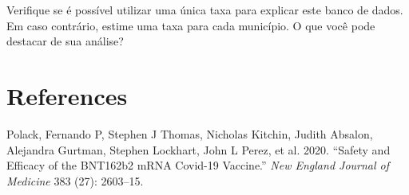 \documentclass[
  letterpaper,
  DIV=11,
  numbers=noendperiod]{scrreprt}
\newlength{\cslhangindent}
\newenvironment{CSLReferences}[2] %
 {\begin{list}{}{%
  \setlength{\itemindent}{0pt}
  \setlength{\leftmargin}{0pt}
  \setlength{\parsep}{0pt}
  \ifodd #1
   \setlength{\leftmargin}{\cslhangindent}
   \setlength{\itemindent}{-1\cslhangindent}
  \fi
  \setlength{\itemsep}{#2\baselineskip}}}
 {\end{list}}
\theoremstyle{definition}
\theoremstyle{plain}
\theoremstyle{definition}
\theoremstyle{remark}
\begin{document}
Verifique se é possível utilizar uma única taxa para explicar este banco
de dados. Em caso contrário, estime uma taxa para cada município. O que
você pode destacar de sua análise?


\chapter*{References}\label{references}


\label{refs}
\begin{CSLReferences}{1}{0}
Polack, Fernando P, Stephen J Thomas, Nicholas Kitchin, Judith Absalon,
Alejandra Gurtman, Stephen Lockhart, John L Perez, et al. 2020.
{``Safety and Efficacy of the BNT162b2 mRNA Covid-19 Vaccine.''}
\emph{New England Journal of Medicine} 383 (27): 2603--15.

\end{CSLReferences}
\end{document}
